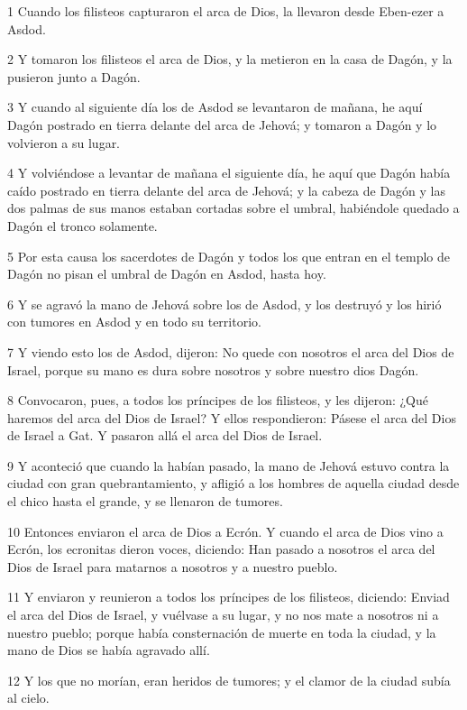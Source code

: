 \par 1 Cuando los filisteos capturaron el arca de Dios, la llevaron desde Eben-ezer a Asdod.
\par 2 Y tomaron los filisteos el arca de Dios, y la metieron en la casa de Dagón, y la pusieron junto a Dagón.
\par 3 Y cuando al siguiente día los de Asdod se levantaron de mañana, he aquí Dagón postrado en tierra delante del arca de Jehová; y tomaron a Dagón y lo volvieron a su lugar.
\par 4 Y volviéndose a levantar de mañana el siguiente día, he aquí que Dagón había caído postrado en tierra delante del arca de Jehová; y la cabeza de Dagón y las dos palmas de sus manos estaban cortadas sobre el umbral, habiéndole quedado a Dagón el tronco solamente.
\par 5 Por esta causa los sacerdotes de Dagón y todos los que entran en el templo de Dagón no pisan el umbral de Dagón en Asdod, hasta hoy.
\par 6 Y se agravó la mano de Jehová sobre los de Asdod, y los destruyó y los hirió con tumores en Asdod y en todo su territorio.
\par 7 Y viendo esto los de Asdod, dijeron: No quede con nosotros el arca del Dios de Israel, porque su mano es dura sobre nosotros y sobre nuestro dios Dagón.
\par 8 Convocaron, pues, a todos los príncipes de los filisteos, y les dijeron: ¿Qué haremos del arca del Dios de Israel? Y ellos respondieron: Pásese el arca del Dios de Israel a Gat. Y pasaron allá el arca del Dios de Israel.
\par 9 Y aconteció que cuando la habían pasado, la mano de Jehová estuvo contra la ciudad con gran quebrantamiento, y afligió a los hombres de aquella ciudad desde el chico hasta el grande, y se llenaron de tumores.
\par 10 Entonces enviaron el arca de Dios a Ecrón. Y cuando el arca de Dios vino a Ecrón, los ecronitas dieron voces, diciendo: Han pasado a nosotros el arca del Dios de Israel para matarnos a nosotros y a nuestro pueblo.
\par 11 Y enviaron y reunieron a todos los príncipes de los filisteos, diciendo: Enviad el arca del Dios de Israel, y vuélvase a su lugar, y no nos mate a nosotros ni a nuestro pueblo; porque había consternación de muerte en toda la ciudad, y la mano de Dios se había agravado allí.
\par 12 Y los que no morían, eran heridos de tumores; y el clamor de la ciudad subía al cielo.

